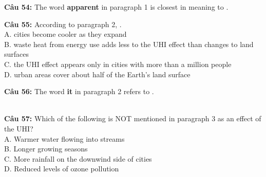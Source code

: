 \documentclass[12pt,a4paper]{article}
\begin{document}



\noindent \textbf{Câu 54:} The word \textbf{apparent} in paragraph 1 is closest in meaning to \underline{\hspace{1.2cm}}.\\
\noindent{}




\noindent \textbf{Câu 55:} According to paragraph 2, \underline{\hspace{1.2cm}}.\\
\noindent A. cities become cooler as they expand\\
\noindent B. waste heat from energy use adds less to the UHI effect than changes to land surfaces\\
\noindent C. the UHI effect appears only in cities with more than a million people\\
\noindent D. urban areas cover about half of the Earth's land surface




\noindent \textbf{Câu 56:} The word \textbf{it} in paragraph 2 refers to \underline{\hspace{1.2cm}}.\\
\noindent{}\\
\noindent{}




\noindent \textbf{Câu 57:} Which of the following is NOT mentioned in paragraph 3 as an effect of the UHI?\\
\noindent A. Warmer water flowing into streams\\
\noindent B. Longer growing seasons\\
\noindent C. More rainfall on the downwind side of cities\\
\noindent D. Reduced levels of ozone pollution

\end{document}
